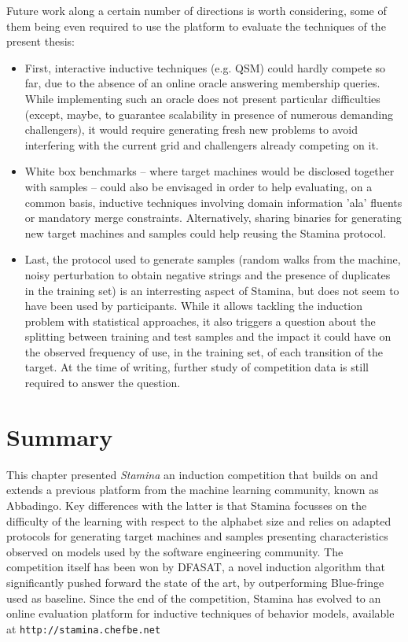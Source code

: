 Future work along a certain number of directions is worth considering, some of them being even required to use the platform to evaluate the techniques of the present thesis:

\begin{itemize}

\item First, interactive inductive techniques (e.g. QSM) could hardly compete so far, due to the absence of an online oracle answering membership queries. While implementing such an oracle does not present particular difficulties (except, maybe, to guarantee scalability in presence of numerous demanding challengers), it would require generating fresh new problems to avoid interfering with the current grid and challengers already competing on it. 

\item White box benchmarks -- where target machines would be disclosed together with samples -- could also be envisaged in order to help evaluating, on a common basis, inductive techniques involving domain information 'ala' fluents or mandatory merge constraints. Alternatively, sharing binaries for generating new target machines and samples could help reusing the Stamina protocol. 

\item Last, the protocol used to generate samples (random walks from the machine, noisy perturbation to obtain negative strings and the presence of duplicates in the training set) is an interresting aspect of Stamina, but does not seem to have been used by participants. While it allows tackling the induction problem with statistical approaches, it also triggers a question about the splitting between training and test samples and the impact it could have on the observed frequency of use, in the training set, of each transition of the target. At the time of writing, further study of competition data is still required to answer the question.

\end{itemize}

\section*{Summary}

This chapter presented \emph{Stamina} an induction competition that builds on and extends a previous platform from the machine learning community, known as Abbadingo. Key differences with the latter is that Stamina focusses on the difficulty of the learning with respect to the alphabet size and relies on adapted protocols for generating target machines and samples presenting characteristics observed on models used by the software engineering community. The competition itself has been won by DFASAT, a novel induction algorithm that significantly pushed forward the state of the art, by outperforming Blue-fringe used as baseline. Since the end of the competition, Stamina has evolved to an online evaluation platform for inductive techniques of behavior models, available at \verb|http://stamina.chefbe.net|
